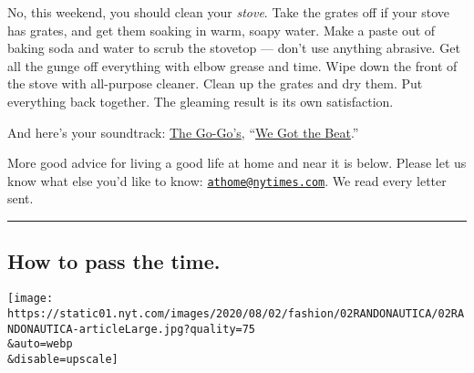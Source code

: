 No, this weekend, you should clean your \emph{stove}. Take the grates
off if your stove has grates, and get them soaking in warm, soapy water.
Make a paste out of baking soda and water to scrub the stovetop ---
don't use anything abrasive. Get all the gunge off everything with elbow
grease and time. Wipe down the front of the stove with all-purpose
cleaner. Clean up the grates and dry them. Put everything back together.
The gleaming result is its own satisfaction.

And here's your soundtrack:
\href{https://www.nytimes.com/2020/07/29/arts/music/the-go-gos-documentary.html}{The
Go-Go's},
``\href{https://www.youtube.com/watch?v=f55KlPe81Yw\&feature=youtu.be}{We
Got the Beat}.''

More good advice for living a good life at home and near it is below.
Please let us know what else you'd like to know:
\href{mailto:athome@nytimes.com}{\nolinkurl{athome@nytimes.com}}. We
read every letter sent.

\begin{center}\rule{0.5\linewidth}{\linethickness}\end{center}

\hypertarget{how-to-pass-the-time}{%
\subsection{How to pass the time.}\label{how-to-pass-the-time}}

\texttt{[image: https://static01.nyt.com/images/2020/08/02/fashion/02RANDONAUTICA/02RANDONAUTICA-articleLarge.jpg?quality=75\\\&auto=webp\\\&disable=upscale]}

